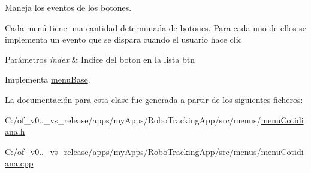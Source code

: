 Maneja los eventos de los botones. 

Cada menú tiene una cantidad determinada de botones. Para cada uno de ellos se implementa un evento que se dispara cuando el usuario hace clic


\begin{DoxyParams}{Parámetros}
{\em index} & Indice del boton en la lista btn \\
\hline
\end{DoxyParams}


Implementa \hyperlink{classmenu_base_a5a88a45efd3bc47b4731fb21749a97d5}{menu\+Base}.



La documentación para esta clase fue generada a partir de los siguientes ficheros\+:\begin{DoxyCompactItemize}
\item 
C\+:/of\+\_\+v0..\+\_\+vs\+\_\+release/apps/my\+Apps/\+Robo\+Tracking\+App/src/menus/\hyperlink{menu_cotidiana_8h}{menu\+Cotidiana.\+h}\item 
C\+:/of\+\_\+v0..\+\_\+vs\+\_\+release/apps/my\+Apps/\+Robo\+Tracking\+App/src/menus/\hyperlink{menu_cotidiana_8cpp}{menu\+Cotidiana.\+cpp}\end{DoxyCompactItemize}
